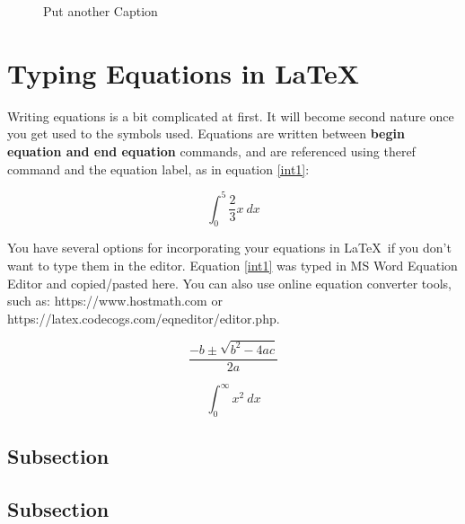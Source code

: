 \begin{figure}[!ht]
    \centering
{}
\caption{Put another Caption}
    \label{fig:my_label2}
\end{figure}


\newpage
\section{Typing Equations in \LaTeX}

\noindent Writing equations is a bit complicated at first. It will become second nature once you get used to the symbols used. Equations are written between \textbf{begin equation and end equation} commands, and are referenced using theref command and the equation label, as in equation \ref{int1}:

\begin{equation}
\label{int1}
\int_{0}^{5}{\frac{2}{3}x}\ dx
\end{equation}

\noindent  You have several options for incorporating your equations in \LaTeX\ if you don't want to type them in the editor. Equation \ref{int1} was typed in MS Word Equation Editor and copied/pasted here. You can also use online equation converter tools, such as: \newline
 https://www.hostmath.com or https://latex.codecogs.com/eqneditor/editor.php.

\begin{equation}
\label{frac}
\frac{-b\pm\sqrt{b^2-4ac}}{2a}
\end{equation}


\begin{equation}
\label{int2}
\int_{0}^{\infty}x^{2}\ dx
\end{equation}



\subsection{Subsection}
\noindent \lipsum[1][1-3] %

\subsection{Subsection}

\noindent \lipsum[1][4-6] %